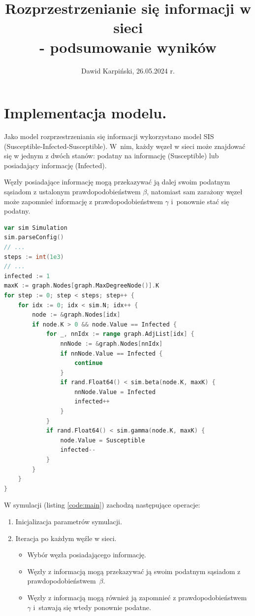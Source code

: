 \documentclass[13pt,a4paper]{article}
\begin{document}
\title{
	\LARGE
	\textbf{Rozprzestrzenianie się informacji w sieci\\ -  podsumowanie wyników}
}
\author{
	\large
	Dawid Karpiński, 26.05.2024 r.
}
\date{}
\maketitle


\section{Implementacja modelu.}

Jako model rozprzestrzeniania się informacji wykorzystano model SIS (Susceptible-Infected-Susceptible). W nim, każdy węzeł w sieci może znajdować się w jednym z dwóch stanów: podatny na informację (Susceptible) lub posiadający informację (Infected).

Węzły posiadające informację mogą przekazywać ją dalej swoim podatnym sąsiadom z ustalonym prawdopodobieństwem $\beta$, natomiast sam zarażony węzeł może zapomnieć informację z prawdopodobieństwem $\gamma$ i ponownie stać się podatny.

\begin{lstlisting}[language=go,caption={\centering\textbf{Fragment kodu symulacji napisanego w języku Go.\\Cały kod do projektu zamieszczono na \url{https://github.com/davkk/sis-model}.}},label={code:main}]
var sim Simulation
sim.parseConfig()
// ...
steps := int(1e3)
// ...
infected := 1
maxK := graph.Nodes[graph.MaxDegreeNode()].K
for step := 0; step < steps; step++ {
    for idx := 0; idx < sim.N; idx++ {
        node := &graph.Nodes[idx]
        if node.K > 0 && node.Value == Infected {
            for _, nnIdx := range graph.AdjList[idx] {
                nnNode := &graph.Nodes[nnIdx]
                if nnNode.Value == Infected {
                    continue
                }
                if rand.Float64() < sim.beta(node.K, maxK) {
                    nnNode.Value = Infected
                    infected++
                }
            }
            if rand.Float64() < sim.gamma(node.K, maxK) {
                node.Value = Susceptible
                infected--
            }
        }
    }
}
\end{lstlisting}

W symulacji (listing \ref{code:main}) zachodzą następujące operacje:
\begin{enumerate}
	\item Inicjalizacja parametrów symulacji.
	\item Iteracja po każdym węźle w sieci.
	      \begin{itemize}
		      \item Wybór węzła posiadającego informację.
		      \item Węzły z informacją mogą przekazywać ją swoim podatnym sąsiadom z prawdopodobieństwem $\beta$.
		      \item Węzły z informacją mogą również ją zapomnieć z prawdopodobieństwem $\gamma$ i stawają się wtedy ponownie podatne.
	      \end{itemize}
\end{enumerate}
\end{document}
